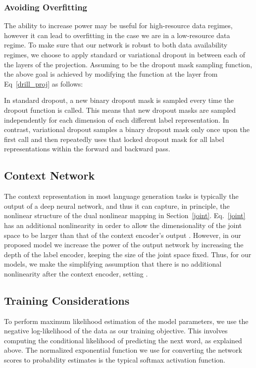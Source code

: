 \documentclass{article}
\begin{document}
\subsubsection{Avoiding Overfitting}
The ability to increase power may be useful for high-resource data regimes, however it can lead to overfitting in the case we are in a low-resource data regime. To make sure that our network is robust to both data availability regimes, we choose to apply standard \cite{dropout15} or variational \cite{vardropout16} dropout in between each of the  layers of the projection.  Assuming  to be the dropout mask sampling function, the above goal is achieved by modifying the function  at the  layer from Eq~\ref{drill_proj} as follows:
   
In standard dropout, a new binary dropout mask is sampled every time the dropout function is called. This means that new dropout masks are sampled independently for each dimension of each different label representation. In contrast, variational dropout samples a binary dropout mask only once upon the first call and then repeatedly uses that locked dropout mask for all label representations within the forward and backward pass.


\subsection{Context Network} 
The context representation  in most language generation tasks is typically the output of a deep neural network, and thus it can capture, in principle, the nonlinear structure of the dual nonlinear mapping in Section~\ref{joint}. Eq.~\ref{joint} has an additional nonlinearity  in order to allow the dimensionality of the joint space to be larger than that of the context encoder's output .  However, in our proposed model we increase the power of the output network by increasing the depth of the label encoder, keeping the size of the joint space fixed.  Thus, for our models, we make the simplifying assumption that there is no additional nonlinearity after the context encoder, setting .
 
\subsection{Training Considerations}
To perform maximum likelihood estimation of the model parameters, we use the negative log-likelihood of the data as our training objective.  This involves computing the conditional likelihood of predicting the next word, as explained above. The normalized exponential function we use for converting the network scores to probability estimates is the typical softmax activation function. 
\end{document}
